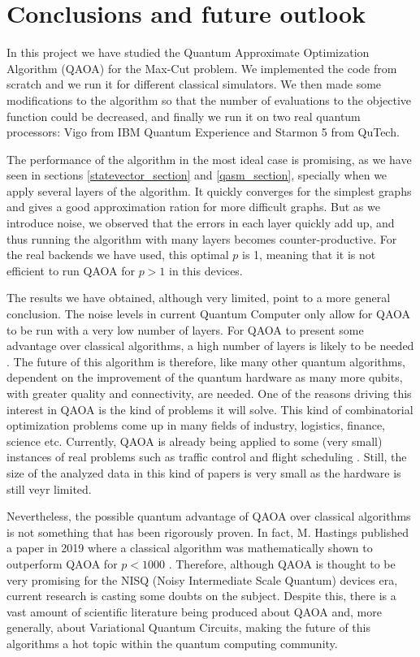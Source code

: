 
\section{Conclusions and future outlook}
In this project we have studied the Quantum Approximate Optimization Algorithm (QAOA) for the Max-Cut problem. We implemented the code from scratch and we run it for different classical simulators. We then made some modifications to the algorithm so that the number of evaluations to the objective function could be decreased, and finally we run it on two real quantum processors: Vigo from IBM Quantum Experience and Starmon 5 from QuTech. 

The performance of the algorithm in the most ideal case is promising, as we have seen in sections \ref{statevector_section} and \ref{qasm_section}, specially when we apply several layers of the algorithm. It quickly converges for the simplest graphs and gives a good approximation ration for more difficult graphs. But as we introduce noise, we observed that the errors in each layer quickly add up, and thus running the algorithm with many layers becomes counter-productive. For the real backends we have used, this optimal $p$ is 1, meaning that it is not efficient to run QAOA for $p>1$ in this devices. 

The results we have obtained, although very limited, point to a more general conclusion. The noise levels in current Quantum Computer only allow for QAOA to be run with a very low number of layers. For QAOA to present some advantage over classical algorithms, a high number of layers is likely to be needed \cite{Guerreschi_2019}. The future of this algorithm is therefore, like many other quantum algorithms, dependent on the improvement of the quantum hardware as many more qubits, with greater quality and connectivity, are needed. One of the reasons driving this interest in QAOA is the kind of problems it will solve. This kind of combinatorial optimization problems come up in many fields of industry, logistics, finance, science etc. Currently, QAOA is already being applied to some (very small) instances of real problems such as traffic control \cite{zhang2020qed} and flight scheduling \cite{Vikst_l_2020}. Still, the size of the analyzed data in this kind of papers is very small as the hardware is still veyr limited.

Nevertheless, the possible quantum advantage of QAOA over classical algorithms is not something that has been rigorously proven. In fact, M. Hastings published a paper in 2019 where a classical algorithm was mathematically shown to outperform QAOA for $p<1000$ \cite{hastings2019classical}. Therefore, although QAOA is thought to be very promising for the NISQ (Noisy Intermediate Scale Quantum) devices era, current research is casting some doubts on the subject. Despite this, there is a vast amount of scientific literature being produced about QAOA and, more generally, about Variational Quantum Circuits, making the future of this algorithms a hot topic within the quantum computing community. 

